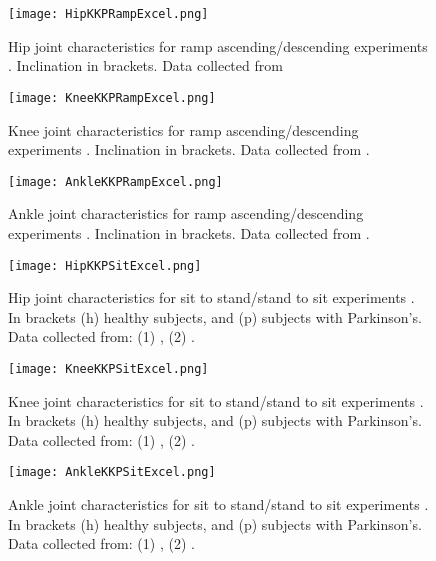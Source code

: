 \begin{figure}[htbp]
    \centering
    \texttt{[image: HipKKPRampExcel.png]}
    \caption{Hip joint characteristics for ramp ascending/descending experiments \cite{solis2017characterization}. Inclination in brackets. Data collected from \cite{mcintosh2006gait}}
    \label{fig:hipKKPRamp}
\end{figure}

\begin{figure}[htbp]
    \centering
    \texttt{[image: KneeKKPRampExcel.png]}
    \caption{Knee joint characteristics for ramp ascending/descending experiments \cite{solis2017characterization}. Inclination in brackets. Data collected from \cite{mcintosh2006gait}. }
    \label{fig:kneeKKPRamp}
\end{figure}

\begin{figure}[htbp]
    \centering
    \texttt{[image: AnkleKKPRampExcel.png]}
    \caption{Ankle joint characteristics for ramp ascending/descending experiments \cite{solis2017characterization}. Inclination in brackets. Data collected from \cite{mcintosh2006gait}.}
    \label{fig:ankleKKPRamp}
\end{figure}

\begin{figure}[htbp]
    \centering
    \texttt{[image: HipKKPSitExcel.png]}
    \caption{Hip joint characteristics for sit to stand/stand to sit experiments \cite{solis2017characterization}. In brackets (h) healthy subjects, and (p) subjects with Parkinson's. Data collected from: (1) \cite{roebroeck1994biomechanics}, (2) \cite{mak2003joint}.  }
    \label{fig:hipKKPSit}
\end{figure}

\begin{figure}[htbp]
    \centering
    \texttt{[image: KneeKKPSitExcel.png]}
    \caption{Knee joint characteristics for sit to stand/stand to sit experiments \cite{solis2017characterization}. In brackets (h) healthy subjects, and (p) subjects with Parkinson's. Data collected from: (1) \cite{roebroeck1994biomechanics}, (2) \cite{mak2003joint}.  }
    \label{fig:kneeKKPSit}
\end{figure}

\begin{figure}[htbp]
    \centering
    \texttt{[image: AnkleKKPSitExcel.png]}
    \caption{Ankle joint characteristics for sit to stand/stand to sit experiments \cite{solis2017characterization}. In brackets (h) healthy subjects, and (p) subjects with Parkinson's. Data collected from: (1) \cite{roebroeck1994biomechanics}, (2) \cite{mak2003joint}.  }
    \label{fig:ankleKKPSit}
\end{figure}

